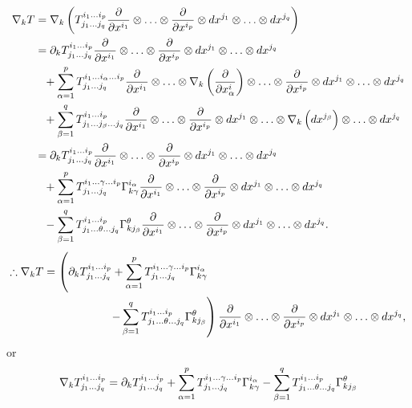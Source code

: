 \begin{align*}
    \nabla_k T&=\nabla_k \left(
        \tensor*{T}{^{i_1\ldots i_p}_{j_1\ldots j_q}}
        \pdv{x^{i_1}}\otimes \ldots \otimes\pdv{x^{i_p}}\otimes 
        dx^{j_1}\otimes\ldots \otimes dx^{j_q}
        \right)\\
        &=\partial_k \tensor*{T}{^{i_1\ldots i_p}_{j_1\ldots j_q}}
        \pdv{x^{i_1}}\otimes \ldots \otimes\pdv{x^{i_p}}\otimes 
        dx^{j_1}\otimes\ldots \otimes dx^{j_q}\\
        &\phantom{=}+\sum_{\alpha=1}^p
        \tensor*{T}{^{i_1\ldots i_\alpha\ldots i_p}_{j_1\ldots j_q}}
        \pdv{x^{i_1}}\otimes \ldots \otimes
        \nabla_k\left(\pdv{x^i_{\alpha}}\right)\otimes
        \ldots \otimes\pdv{x^{i_p}}\otimes 
        dx^{j_1}\otimes\ldots \otimes dx^{j_q}\\
        &\phantom{=}+\sum_{\beta=1}^q
        \tensor*{T}{^{i_1\ldots i_p}_{j_1\ldots j_\beta \ldots j_q}}
        \pdv{x^{i_1}}\otimes \ldots \otimes\pdv{x^{i_p}}\otimes 
        dx^{j_1}\otimes\ldots\otimes \nabla_k\left(
        d x^{j_\beta}\right)\otimes\ldots \otimes dx^{j_q}\\
        &=\partial_k \tensor*{T}{^{i_1\ldots i_p}_{j_1\ldots j_q}}
        \pdv{x^{i_1}}\otimes \ldots \otimes\pdv{x^{i_p}}\otimes 
        dx^{j_1}\otimes\ldots \otimes dx^{j_q}\\
        &\phantom{=}+\sum_{\alpha=1}^p
        \tensor*{T}{^{i_1\ldots \gamma\ldots i_p}_{j_1\ldots j_q}}
        \Gamma\indices*{_{k\gamma}^{i_\alpha}}
        \pdv{x^{i_1}}\otimes \ldots\otimes\pdv{x^{i_p}}\otimes 
        dx^{j_1}\otimes\ldots \otimes dx^{j_q}\\
        &\phantom{=}-\sum_{\beta=1}^q 
        \tensor*{T}{^{i_1\ldots i_p}_{j_1\ldots\theta \ldots j_q}}
        \Gamma\indices*{_{kj_\beta}^\theta}
        \pdv{x^{i_1}}\otimes \ldots \otimes\pdv{x^{i_p}}\otimes 
        dx^{j_1}\otimes\ldots \otimes dx^{j_q}.
\end{align*}
\begin{align*}
    \therefore\nabla_k T&=\left(
    \partial_k \tensor*{T}{^{i_1\ldots i_p}_{j_1\ldots j_q}}
    +\sum_{\alpha=1}^p
    \tensor*{T}{^{i_1\ldots \gamma\ldots i_p}_{j_1\ldots j_q}}
    \Gamma\indices*{_{k\gamma}^{i_\alpha}}\right.\\
    &\phantom{aaaaaaaaaaa}\left.
    -\sum_{\beta=1}^q 
        \tensor*{T}{^{i_1\ldots i_p}_{j_1\ldots\theta \ldots j_q}}
        \Gamma\indices*{_{kj_\beta}^\theta}
    \right)\pdv{x^{i_1}}\otimes \ldots \otimes\pdv{x^{i_p}}\otimes 
    dx^{j_1}\otimes\ldots \otimes dx^{j_q},
\end{align*}
or
\[\nabla_k \tensor*{T}{^{i_1\ldots i_p}_{j_1\ldots j_q}}
=\partial_k \tensor*{T}{^{i_1\ldots i_p}_{j_1\ldots j_q}}
+\sum_{\alpha=1}^p
\tensor*{T}{^{i_1\ldots \gamma\ldots i_p}_{j_1\ldots j_q}}
\Gamma\indices*{_{k\gamma}^{i_\alpha}}
-\sum_{\beta=1}^q 
\tensor*{T}{^{i_1\ldots i_p}_{j_1\ldots\theta \ldots j_q}}
\Gamma\indices*{_{kj_\beta}^\theta}\]
